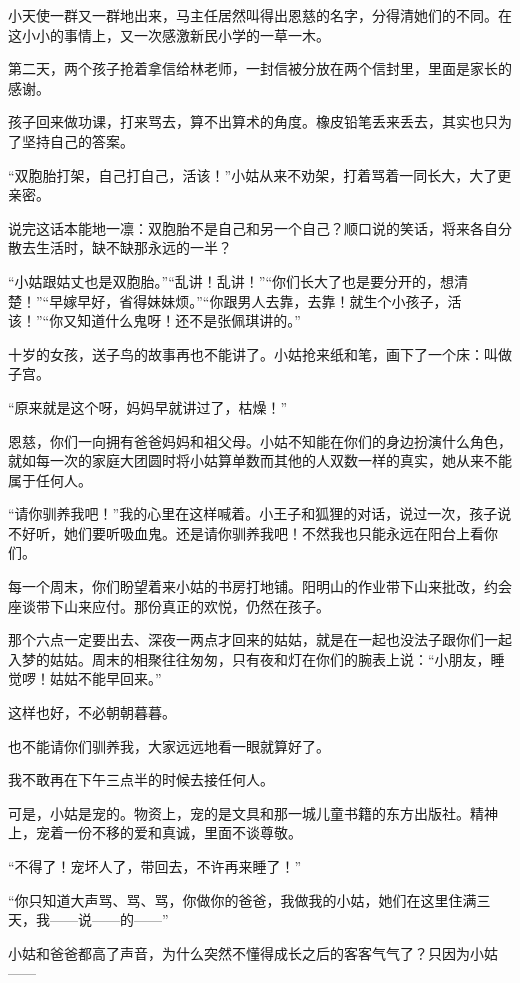 \par 小天使一群又一群地出来，马主任居然叫得出恩慈的名字，分得清她们的不同。在这小小的事情上，又一次感激新民小学的一草一木。
\par 第二天，两个孩子抢着拿信给林老师，一封信被分放在两个信封里，里面是家长的感谢。
\par 孩子回来做功课，打来骂去，算不出算术的角度。橡皮铅笔丢来丢去，其实也只为了坚持自己的答案。
\par “双胞胎打架，自己打自己，活该！”小姑从来不劝架，打着骂着一同长大，大了更亲密。
\par 说完这话本能地一凛：双胞胎不是自己和另一个自己？顺口说的笑话，将来各自分散去生活时，缺不缺那永远的一半？
\par “小姑跟姑丈也是双胞胎。”“乱讲！乱讲！”“你们长大了也是要分开的，想清楚！”“早嫁早好，省得妹妹烦。”“你跟男人去靠，去靠！就生个小孩子，活该！”“你又知道什么鬼呀！还不是张佩琪讲的。”
\par 十岁的女孩，送子鸟的故事再也不能讲了。小姑抢来纸和笔，画下了一个床：叫做子宫。
\par “原来就是这个呀，妈妈早就讲过了，枯燥！”
\par 恩慈，你们一向拥有爸爸妈妈和祖父母。小姑不知能在你们的身边扮演什么角色，就如每一次的家庭大团圆时将小姑算单数而其他的人双数一样的真实，她从来不能属于任何人。
\par “请你驯养我吧！”我的心里在这样喊着。小王子和狐狸的对话，说过一次，孩子说不好听，她们要听吸血鬼。还是请你驯养我吧！不然我也只能永远在阳台上看你们。
\par 每一个周末，你们盼望着来小姑的书房打地铺。阳明山的作业带下山来批改，约会座谈带下山来应付。那份真正的欢悦，仍然在孩子。
\par 那个六点一定要出去、深夜一两点才回来的姑姑，就是在一起也没法子跟你们一起入梦的姑姑。周末的相聚往往匆匆，只有夜和灯在你们的腕表上说：“小朋友，睡觉啰！姑姑不能早回来。”
\par 这样也好，不必朝朝暮暮。
\par 也不能请你们驯养我，大家远远地看一眼就算好了。
\par 我不敢再在下午三点半的时候去接任何人。
\par 可是，小姑是宠的。物资上，宠的是文具和那一城儿童书籍的东方出版社。精神上，宠着一份不移的爱和真诚，里面不谈尊敬。
\par “不得了！宠坏人了，带回去，不许再来睡了！”
\par “你只知道大声骂、骂、骂，你做你的爸爸，我做我的小姑，她们在这里住满三天，我——说——的——”
\par 小姑和爸爸都高了声音，为什么突然不懂得成长之后的客客气气了？只因为小姑——
